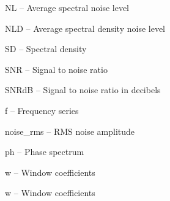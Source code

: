 \begin{tightdesc}
\begin{tightdesc}
        \item[\textsf{NL}] -- Average spectral noise level
        \item[\textsf{NLD}] -- Average spectral density noise level
        \item[\textsf{SD}] -- Spectral density
        \item[\textsf{SNR}] -- Signal to noise ratio
        \item[\textsf{SNRdB}] -- Signal to noise ratio in decibels
        \item[\textsf{f}] -- Frequency series
        \item[\textsf{noise\_rms}] -- RMS noise amplitude
        \item[\textsf{ph}] -- Phase spectrum
        \item[\textsf{w}] -- Window coefficients
        \item[\textsf{w}] -- Window coefficients
    \end{tightdesc}
\end{tightdesc}
